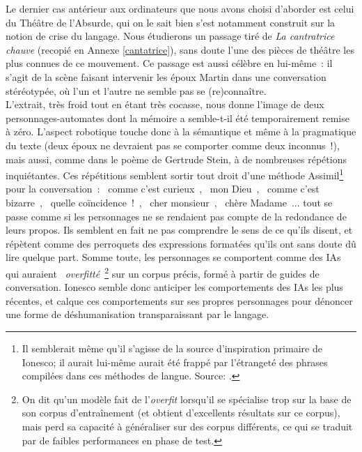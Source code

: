 \documentclass{article}
\begin{document}
				Le dernier cas antérieur aux ordinateurs que nous avons choisi d'aborder est celui du Théâtre de l'Absurde, qui on le sait bien s'est notamment construit sur la notion de crise du langage. Nous étudierons un passage tiré de \textit{La cantratrice chauve} \autocite{ionesco1950} (recopié en Annexe \ref{cantatrice}), sans doute l'une des pièces de théâtre les plus connues de ce mouvement. Ce passage est aussi célèbre en lui-même~: il s'agit de la scène faisant intervenir les époux Martin dans une conversation stéréotypée, où l'un et l'autre ne semble pas se (re)connaître.\\
				
				L'extrait, très froid tout en étant très cocasse, nous donne l'image de deux personnages-automates dont la mémoire a semble-t-il été temporairement remise à zéro. L'aspect robotique touche donc à la sémantique et même à la pragmatique du texte (deux époux ne devraient pas se comporter comme deux inconnus~!), mais aussi, comme dans le poème de Gertrude Stein, à de nombreuses répétions inquiétantes. Ces répétitions semblent sortir tout droit d'une méthode Assimil\footnote{Il semblerait même qu'il s'agisse de la source d'inspiration primaire de Ionesco; il aurait lui-même aurait été frappé par l'étrangeté des phrases compilées dans ces méthodes de langue. Source: \autocite{wiki:cantatrice}.} pour la conversation~: \guillemotleft~comme c'est curieux~\guillemotright, \guillemotleft~mon Dieu~\guillemotright, \guillemotleft~comme c'est
				bizarre~\guillemotright, \guillemotleft~quelle coïncidence~!~\guillemotright, \guillemotleft~cher monsieur~\guillemotright, \guillemotleft~chère Madame~\guillemotright... tout se passe comme si les personnages ne se rendaient pas compte de la redondance de leurs propos. Ils semblent en fait ne pas comprendre le sens de ce qu'ils disent, et répètent comme des perroquets des expressions formatées qu'ils ont sans doute dû lire quelque part. Somme toute, les personnages se comportent comme des IAs qui auraient \guillemotleft~\textit{overfitté}~\guillemotright\footnote{On dit qu'un modèle fait de l'\textit{overfit} lorsqu'il se spécialise trop sur la base de son corpus d'entraînement (et obtient d'excellents résultats sur ce corpus), mais perd sa capacité à généraliser sur des corpus différents, ce qui se traduit par de faibles performances en phase de test.} sur un corpus précis, formé à partir de guides de conversation. Ionesco semble donc anticiper les comportements des IAs les plus récentes, et calque ces comportements sur ses propres personnages pour dénoncer une forme de déshumanisation transparaissant par le langage.\\
				
\end{document}
